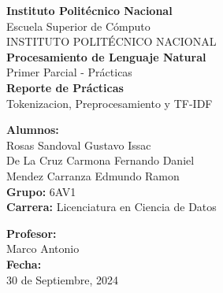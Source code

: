 \documentclass[12pt,a4paper]{article}
\begin{document}
\begin{titlepage}
    \centering
    \vspace*{2cm}
    
    {\huge\bfseries Instituto Politécnico Nacional}\\[0.5cm]
    {\Large Escuela Superior de Cómputo}\\[1.5cm]
    
    {\Large INSTITUTO POLITÉCNICO NACIONAL}\\[1cm]
    
    {\huge\bfseries Procesamiento de Lenguaje Natural}\\[0.5cm]
    {\Large Primer Parcial - Prácticas}\\[2cm]
    
    {\Large\bfseries Reporte de Prácticas}\\[0.5cm]
    {\large Tokenizacion, Preprocesamiento y TF-IDF}\\[2cm]
    
    \begin{minipage}{0.4\textwidth}
        \begin{flushleft}
            \textbf{Alumnos:}\\
            Rosas Sandoval Gustavo Issac\\[0.3cm]
            De La Cruz Carmona Fernando Daniel\\[0.3cm]
            Mendez Carranza Edmundo Ramon\\[0.5cm]
\textbf{Grupo:} 6AV1\\
            \textbf{Carrera:} Licenciatura en Ciencia de Datos
        \end{flushleft}
    \end{minipage}
    \hfill
    \begin{minipage}{0.4\textwidth}
        \begin{flushright}
            \textbf{Profesor:}\\
            Marco Antonio\\[0.5cm]
            \textbf{Fecha:}\\
            30 de Septiembre, 2024
        \end{flushright}
    \end{minipage}
    
    \vfill
\end{titlepage}

\tableofcontents
\newpage
\end{document}
